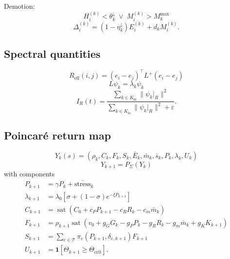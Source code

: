 \documentclass[11pt,a4paper]{article}
\begin{document}
Demotion:
\begin{equation}
H_i^{(k)}<\theta_k^\downarrow
\;\lor\;
M_i^{(k)}>M_k^{\max}
\label{eq:demotion_cond}
\end{equation}
\begin{equation}
\Delta_i^{(k)}=
(1-\eta_k^\downarrow)E_i^{(k)}+d_kM_i^{(k)}.
\label{eq:demotion_energy}
\end{equation}

\subsection{Spectral quantities}

\begin{equation}
R_{\mathrm{eff}}(i,j)=(e_i-e_j)^\top L^+(e_i-e_j)
\label{eq:effective_resistance}
\end{equation}
\begin{equation}
L\psi_k=\lambda_k\psi_k
\label{eq:eigenmodes}
\end{equation}
\begin{equation}
I_R(t)=
\frac{\sum_{k\in K_{\mathrm{hi}}}\|\psi_k|_R\|^2}
{\sum_{k\in K_{\mathrm{lo}}}\|\psi_k|_R\|^2+\varepsilon}.
\label{eq:modal_instability}
\end{equation}

\subsection{Poincar\'e return map}

\begin{equation}
Y_k(s)=
(\rho_k,C_k,F_k,S_k,\bar E_k,\bar m_k,\bar s_k,P_k,\lambda_k,U_k)
\label{eq:poincare_state}
\end{equation}
\begin{equation}
Y_{k+1}=P_\Sigma(Y_k)
\label{eq:poincare_map}
\end{equation}
with components
\begin{align}
P_{k+1}&=\gamma P_k+\bar{\mathrm{stress}}_k
\label{eq:pmap_pressure}\\
\lambda_{k+1}&=\lambda_0\left[\sigma+(1-\sigma)e^{-\xi P_{k+1}}\right]
\label{eq:pmap_lambda}\\
C_{k+1}&=\operatorname{sat}(C_0+c_P P_{k+1}-c_RR_k-c_m\bar m_k)
\label{eq:pmap_capacity}\\
F_{k+1}&=\rho_{k+1}\operatorname{sat}(v_0+g_GG_k-g_PP_k-g_RR_k-g_m\bar m_k+g_KK_{k+1})
\label{eq:pmap_flux}\\
S_{k+1}&=\sum_{e\in\mathcal{T}}\pi_e(P_{k+1},\delta_{e,k+1})F_{k+1}
\label{eq:pmap_siphon}\\
U_{k+1}&=\mathbf{1}[\Theta_{k+1}\ge \Theta_{\mathrm{crit}}].
\label{eq:pmap_unpack}
\end{align}
\end{document}
